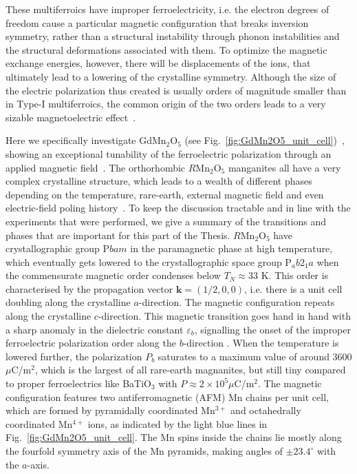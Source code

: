 These multiferroics have improper ferroelectricity, i.e. the electron degrees of freedom cause a particular magnetic configuration that breaks inversion symmetry, rather than a structural instability through phonon instabilities and the structural deformations associated with them.
To optimize the magnetic exchange energies, however, there will be displacements of the ions, that ultimately lead to a lowering of the crystalline symmetry.  
Although the size of the electric polarization thus created is usually orders of magnitude smaller than in Type-I multiferroics, the common origin of the two orders leads to a very sizable magnetoelectric effect~\cite{Oh2014}.

Here we specifically investigate GdMn$_2$O$_5$ (see Fig.~\ref{fig:GdMn2O5_unit_cell})~\cite{Khomskii2009}, showing an exceptional tunability of the ferroelectric polarization through an applied magnetic field~\cite{Lee13}.
The orthorhombic $R$Mn$_2$O$_5$ manganites all have a very complex crystalline structure, which leads to a wealth of different phases depending on the temperature, rare-earth, external magnetic field and even electric-field poling history~\cite{Zheng2019}.
To keep the discussion tractable and in line with the experiments that were performed, we give a summary of the transitions and phases that are important for this part of the Thesis.
$R$Mn$_2$O$_5$ have crystallographic group P$bam$ \cite{Alonso97} in the paramagnetic phase at high temperature, which eventually gets lowered to the crystallographic space group P$_ab2_1a$ when the commensurate magnetic order condenses below $T_{N} \approx 33$ K.
This order is characterised by the propagation vector $\bm{k} = (1/2, 0, 0)$, i.e. there is a unit cell doubling along the crystalline $a$-direction.
The magnetic configuration repeats along the crystalline $c$-direction. This magnetic transition goes hand in hand with a sharp anomaly in the dielectric constant $\varepsilon_b$, signalling the onset of the improper ferroelectric polarization order along the $b$-direction \cite{Lee13}.
When the temperature is lowered further, the polarization $P_b$ saturates to a maximum value of around 3600 $\mu$C/m$^2$, which is the largest of all rare-earth magnanites, but still tiny compared to proper ferroelectrics like BaTiO$_3$ with $P \approx 2 \times 10^5 \mu $C/m$^2$.
The magnetic configuration features two antiferromagnetic (AFM) Mn chains per unit cell, which are formed by pyramidally coordinated Mn$^{3+}$ and octahedrally coordinated Mn$^{4+}$ ions, as indicated by the light blue lines in Fig.~\ref{fig:GdMn2O5_unit_cell}. The Mn spins inside the chains lie mostly along the fourfold symmetry axis of the Mn pyramids, making angles of $\pm 23.4^\circ$ with the $a$-axis.

